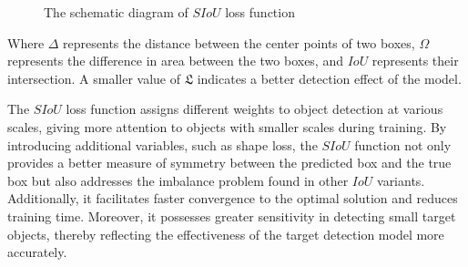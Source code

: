 \documentclass[aic]{iosart2x}
\begin{document}
\begin{figure}[htbp]
    \centering
    
    \caption{The schematic diagram of $SIoU$ loss function}
    \label{fig:SIoU_loss}
\end{figure}

Where $\Delta$ represents the distance between the center points of two boxes, $\Omega$ represents the difference in area between the two boxes, and $IoU$ represents their intersection. A smaller value of $\mathfrak{L}$ indicates a better detection effect of the model.

The $SIoU$ loss function assigns different weights to object detection at various scales, giving more attention to objects with smaller scales during training. By introducing additional variables, such as shape loss, the $SIoU$ function not only provides a better measure of symmetry between the predicted box and the true box but also addresses the imbalance problem found in other $IoU$ variants. Additionally, it facilitates faster convergence to the optimal solution and reduces training time. Moreover, it possesses greater sensitivity in detecting small target objects, thereby reflecting the effectiveness of the target detection model more accurately.
\end{document}
